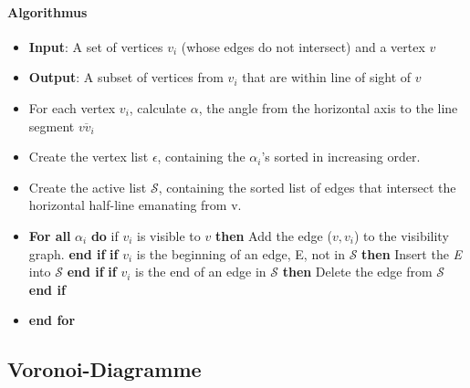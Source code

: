 \paragraph{Algorithmus}
\begin{itemize}
	\item \textbf{Input}: A  set of vertices ${v_i}$ (whose edges do not intersect) and a vertex $v$
	\item \textbf{Output}: A subset of vertices from ${v_i}$ that are within line of sight of $v$
\end{itemize}
\begin{itemize}
	\item For each vertex $v_i$, calculate $\alpha$, the angle from the horizontal axis to the line segment $\overline{vv_i}$
	\item Create the vertex list $\epsilon$, containing the $\alpha_i$'s sorted in increasing order.
	\item Create the active list $\mathcal{S}$, containing the sorted list of edges that intersect the horizontal half-line emanating from v.
	\item \textbf{For all} $\alpha_i$ \textbf{do}
	\subitem if $v_i$ is visible to $v$ \textbf{then}
	\subsubitem Add the edge ($v, v_i$) to the visibility graph.
	\subitem \textbf{end if}
	\subitem \textbf{if} $v_i$ is the beginning of an edge, E, not in $\mathcal{S}$ \textbf{then}
	\subsubitem Insert the \textit{E} into $\mathcal{S}$
	\subitem \textbf{end if}
	\subitem \textbf{if} $v_i$ is the end of an edge in $\mathcal{S}$ \textbf{then}
	\subsubitem Delete the edge from $\mathcal{S}$
	\subitem \textbf{end if}
	\item \textbf{end for}
\end{itemize}
\subsection{Voronoi-Diagramme}
